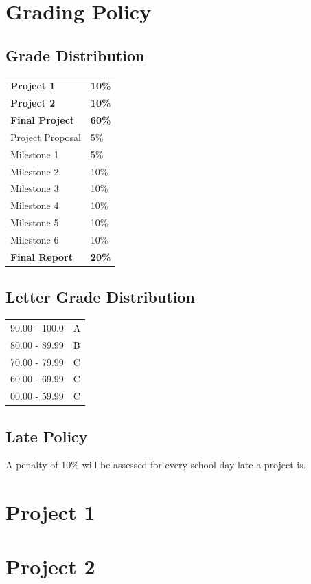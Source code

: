 \documentclass[11pt]{article}
\newcommand\tab[1][.5in]{\hspace*{#1}}
\begin{document}
\newpage
\section{Grading Policy}
\subsection{Grade Distribution}
\begin{tabular}{ll}
    \textbf{Project 1} & \textbf{10\%} \\
    \textbf{Project 2} & \textbf{10\%} \\
    \textbf{Final Project} & \textbf{60\%} \\
    \tab Project Proposal & 5\% \\
    \tab Milestone 1 & 5\% \\
    \tab Milestone 2 & 10\% \\
    \tab Milestone 3 & 10\% \\
    \tab Milestone 4 & 10\% \\
    \tab Milestone 5 & 10\% \\
    \tab Milestone 6 & 10\% \\
    \textbf{Final Report} & \textbf{20\%}
\end{tabular}

\subsection{Letter Grade Distribution}
\begin{tabular}{ll}
    90.00 - 100.0 & A \\
    80.00 - 89.99 & B \\
    70.00 - 79.99 & C \\
    60.00 - 69.99 & C \\
    00.00 - 59.99 & C
\end{tabular}

\subsection{Late Policy}
A penalty of 10\% will be assessed for every school day late a project is.

\section{Project 1}

\section{Project 2}
\end{document}
